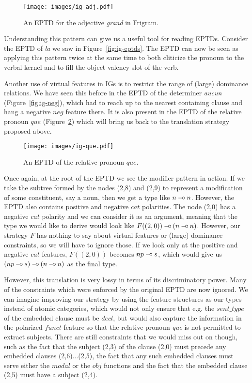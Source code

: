 \begin{figure}
  \centering
  \texttt{[image: images/ig-adj.pdf]}
  \caption{\label{fig:ig-adj} An EPTD for the adjective \emph{grand} in
    Frigram.}
\end{figure}

Understanding this pattern can give us a useful tool for reading
EPTDs. Consider the EPTD of \emph{la} we saw in
Figure~\ref{fig:ig-eptds}. The EPTD can now be seen as applying this
pattern twice at the same time to both cliticize the pronoun to the
verbal kernel and to fill the object valency slot of the verb.

Another use of virtual features in IGs is to restrict the range of
(large) dominance relations. We have seen this before in the EPTD of the
determiner \emph{aucun} (Figure~\ref{fig:ig-neg}), which had to reach up
to the nearest containing clause and hang a negative $neg$ feature
there.  It is also present in the EPTD of the relative pronoun $que$
(Figure~\ref{fig:ig-que}) which will bring us back to the translation
strategy proposed above.

\begin{figure}
  \centering
  \texttt{[image: images/ig-que.pdf]}
  \caption{\label{fig:ig-que} An EPTD of the relative pronoun $que$.}
\end{figure}

Once again, at the root of the EPTD we see the modifier pattern in
action. If we take the subtree formed by the nodes (2,8) and (2,9) to
represent a modification of some constituent, say a noun, then we get a
type like $n \mathbin{{-}\mkern-3.5mu{\circ}} n$. However, the EPTD also contains positive and
negative $cat$ polarities. The node (2,0) has a negative $cat$ polarity
and we can consider it as an argument, meaning that the type we would
like to derive would look like $F((2,0)) \mathbin{{-}\mkern-3.5mu{\circ}} (n \mathbin{{-}\mkern-3.5mu{\circ}} n)$. However,
our strategy $F$ has nothing to say about virtual features or (large)
dominance constraints, so we will have to ignore those. If we look only
at the positive and negative $cat$ features, $F((2,0))$ becomes $np
\mathbin{{-}\mkern-3.5mu{\circ}} s$, which would give us $(np \mathbin{{-}\mkern-3.5mu{\circ}} s) \mathbin{{-}\mkern-3.5mu{\circ}} (n \mathbin{{-}\mkern-3.5mu{\circ}} n)$ as the
final type.

However, this translation is very lossy in terms of its discriminatory
power. Many of the constraints which were enforced by the original EPTD
are now ignored. We can imagine improving our strategy by using the
feature structures as our types instead of atomic categories, which
would not only ensure that e.g. the $sent\_type$ of the embedded clause
must be $decl$, but would also capture the information in the polarized
$funct$ feature so that the relative pronoun \emph{que} is not permitted
to extract subjects. There are still constraints that we would miss out
on though, such as the fact that the subject (2,3) of the clause (2,0)
must precede any embedded clauses (2,6)...(2,5), the fact that any such
embedded clauses must serve either the $modal$ or the $obj$ functions
and the fact that the embedded clause (2,5) must have a subject (2,4).

